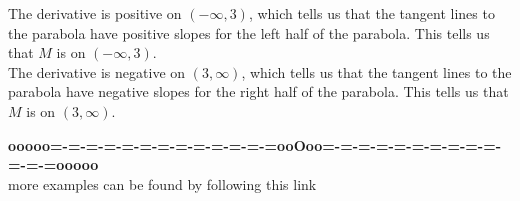 \documentclass{ximera}
\begin{document}
\begin{example}
\begin{explanation}
The derivative is positive on $(-\infty, 3)$, which tells us that the tangent lines to the parabola have positive slopes for the left half of the parabola. This tells us that $M$ is   on $(-\infty, 3)$. \\

The derivative is negative on $(3, \infty)$, which tells us that the tangent lines to the parabola have negative slopes for the right half of the parabola. This tells us that $M$ is   on $(3, \infty)$. \\


\end{explanation}

\end{example}








\begin{center}
\textbf{\textcolor{green!50!black}{ooooo=-=-=-=-=-=-=-=-=-=-=-=-=ooOoo=-=-=-=-=-=-=-=-=-=-=-=-=ooooo}} \\

more examples can be found by following this link\\ 

\end{center}
\end{document}
